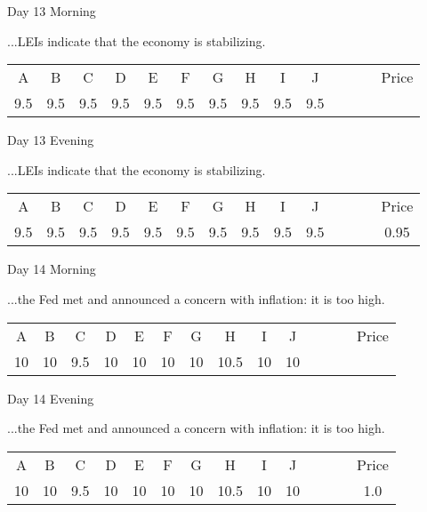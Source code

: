 \documentclass[notes=show]{beamer}
\begin{document}
\begin{frame}{Day 13 Morning}

\qquad ...LEIs indicate that the economy is stabilizing.

\bigskip

\begin{center}
\begin{tabular}{cccccccccccccc}
A & B & C & D & E & F & G & H & I & J &  &  &  & Price \\ 
9.5 & 9.5 & 9.5 & 9.5 & 9.5 & 9.5 & 9.5 & 9.5 & 9.5 & 9.5 &  &  &  & 
\end{tabular}
\end{center}
\end{frame}

\begin{frame}{Day 13 Evening}

\qquad ...LEIs indicate that the economy is stabilizing.

\bigskip

\begin{center}
\begin{tabular}{cccccccccccccc}
A & B & C & D & E & F & G & H & I & J &  &  &  & Price \\ 
9.5 & 9.5 & 9.5 & 9.5 & 9.5 & 9.5 & 9.5 & 9.5 & 9.5 & 9.5 &  &  &  & 0.95%
\end{tabular}
\end{center}
\end{frame}

\begin{frame}{Day 14 Morning}

\qquad ...the Fed met and announced a concern with
inflation: it is too high.

\bigskip

\begin{center}
\begin{tabular}{cccccccccccccc}
A & B & C & D & E & F & G & H & I & J &  &  &  & Price \\ 
10 & 10 & 9.5 & 10 & 10 & 10 & 10 & 10.5 & 10 & 10 &  &  &  & 
\end{tabular}
\end{center}
\end{frame}

\begin{frame}{Day 14 Evening}

\qquad ...the Fed met and announced a concern with
inflation: it is too high.

\bigskip

\begin{center}
\begin{tabular}{cccccccccccccc}
A & B & C & D & E & F & G & H & I & J &  &  &  & Price \\ 
10 & 10 & 9.5 & 10 & 10 & 10 & 10 & 10.5 & 10 & 10 &  &  &  & 1.0%
\end{tabular}
\end{center}
\end{frame}
\end{document}
